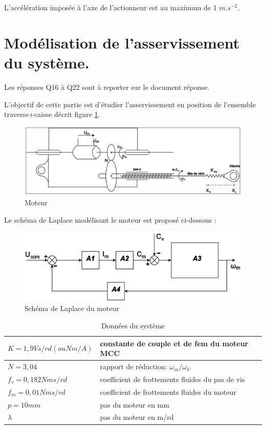 L'accélération imposée à l'axe de l'actionneur est au maximum de 1 $m.s^{-2}$.



\section{Modélisation de l'asservissement du système.}

Les réponses Q16 à Q22 sont à reporter sur le document réponse.

L'objectif de cette partie est d'étudier l'asservissement en position de l'ensemble {traverse+caisse} décrit figure \ref{img15}.

\begin{figure}[!h]
 \centering\includegraphics[width=0.7\linewidth]{img/fig15}
 \caption{Moteur}
 \label{img15}
\end{figure}

Le schéma de Laplace modélisant le moteur est proposé ci-dessous :

\begin{figure}[!h]
 \centering\includegraphics[width=0.7\linewidth]{img/fig18}
 \caption{Schéma de Laplace du moteur}
 \label{img18}
\end{figure}

\begin{table}[ht!]
\begin{tabular}{|l|l|}
\hline
$K=1,9Vs/rd (ou Nm/A)$ &constante de couple et de fem du moteur MCC \\
\hline
$N=3,04$ & rapport de réduction: $\omega_m/\omega_V$ \\
\hline
$f_v=0,182Nms/rd$ & coefficient de frottements fluides du pas de vis \\
\hline
$f_m=0,01Nms/rd$ & coefficient de frottements fluides du moteur \\
\hline
$p=10mm$ & pas du moteur en mm\\
\hline
$\lambda$ & pas du moteur en m/rd \\
\hline
\end{tabular}
 \caption{Données du système}
 \label{donnees_moteur}
\end{table}

